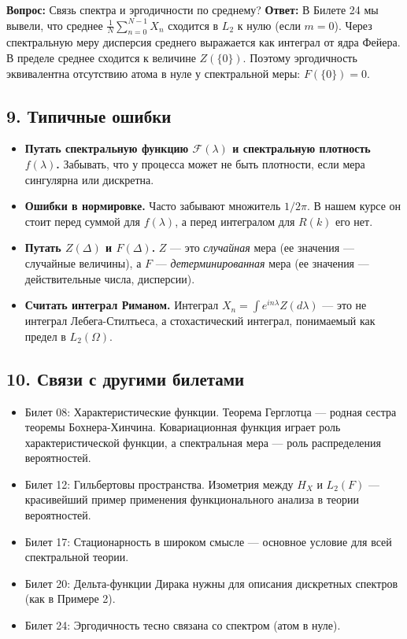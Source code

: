 \documentclass[
  11pt,
  a4paper,
]{article}
\providecommand{\tightlist}{%
  \setlength{\itemsep}{0pt}\setlength{\parskip}{0pt}}
\begin{document}
\textbf{Вопрос:} Связь спектра и эргодичности по среднему?
\textbf{Ответ:} В Билете 24 мы вывели, что среднее
\(\frac{1}{N}\sum_{n=0}^{N-1} X_n\) сходится в \(L_2\) к нулю (если
\(m=0\)). Через спектральную меру дисперсия среднего выражается как
интеграл от ядра Фейера. В пределе среднее сходится к величине
\(Z(\{0\})\). Поэтому эргодичность эквивалентна отсутствию атома в нуле
у спектральной меры: \(F(\{0\}) = 0\).

\subsection{9. Типичные
ошибки}\label{ux442ux438ux43fux438ux447ux43dux44bux435-ux43eux448ux438ux431ux43aux438}

\begin{itemize}
\tightlist
\item
  \textbf{Путать спектральную функцию \(\mathcal F(\lambda)\) и
  спектральную плотность \(f(\lambda)\).} Забывать, что у процесса может
  не быть плотности, если мера сингулярна или дискретна.
\item
  \textbf{Ошибки в нормировке.} Часто забывают множитель \(1/2\pi\). В
  нашем курсе он стоит перед суммой для \(f(\lambda)\), а перед
  интегралом для \(R(k)\) его нет.
\item
  \textbf{Путать \(Z(\Delta)\) и \(F(\Delta)\).} \(Z\) --- это
  \emph{случайная} мера (ее значения --- случайные величины), а \(F\)
  --- \emph{детерминированная} мера (ее значения --- действительные
  числа, дисперсии).
\item
  \textbf{Считать интеграл Риманом.} Интеграл
  \(X_n = \int e^{in\lambda} Z(d\lambda)\) --- это не интеграл
  Лебега-Стилтьеса, а стохастический интеграл, понимаемый как предел в
  \(L_2(\Omega)\).
\end{itemize}

\subsection{10. Связи с другими
билетами}\label{ux441ux432ux44fux437ux438-ux441-ux434ux440ux443ux433ux438ux43cux438-ux431ux438ux43bux435ux442ux430ux43cux438}

\begin{itemize}
\tightlist
\item
  Билет 08: Характеристические функции. Теорема Герглотца --- родная
  сестра теоремы Бохнера-Хинчина. Ковариационная функция играет роль
  характеристической функции, а спектральная мера --- роль распределения
  вероятностей.
\item
  Билет 12: Гильбертовы пространства. Изометрия между \(H_X\) и
  \(L_2(F)\) --- красивейший пример применения функционального анализа в
  теории вероятностей.
\item
  Билет 17: Стационарность в широком смысле --- основное условие для
  всей спектральной теории.
\item
  Билет 20: Дельта-функции Дирака нужны для описания дискретных спектров
  (как в Примере 2).
\item
  Билет 24: Эргодичность тесно связана со спектром (атом в нуле).
\end{itemize}
\end{document}
